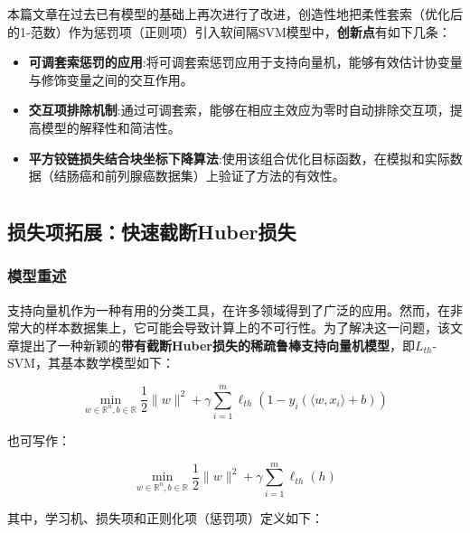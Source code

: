 \documentclass[12pt]{article}  %
\newcommand{\upcite}[1]{\textsuperscript{\textsuperscript{\cite{#1}}}}
\begin{document}
本篇文章在过去已有模型的基础上再次进行了改进，创造性地把柔性套索（优化后的1-范数）作为惩罚项（正则项）引入软间隔SVM模型中，\textbf{创新点}有如下几条：

\begin{itemize}
	\setlength{\parsep}{0ex} %
	\setlength{\topsep}{2ex} %
	\setlength{\itemsep}{1ex} %
	\item \textbf{可调套索惩罚的应用}:将可调套索惩罚应用于支持向量机，能够有效估计协变量与修饰变量之间的交互作用。
	\item \textbf{交互项排除机制}:通过可调套索，能够在相应主效应为零时自动排除交互项，提高模型的解释性和简洁性。
	\item \textbf{平方铰链损失结合块坐标下降算法}:使用该组合优化目标函数，在模拟和实际数据（结肠癌和前列腺癌数据集）上验证了方法的有效性。
\end{itemize}

\subsection{损失项拓展：快速截断Huber损失\upcite{3}}
\subsubsection{模型重述}

支持向量机作为一种有用的分类工具，在许多领域得到了广泛的应用。然而，在非常大的样本数据集上，它可能会导致计算上的不可行性。为了解决这一问题，该文章提出了一种新颖的\textbf{带有截断Huber损失的稀疏鲁棒支持向量机模型}，即$L_{th}$-SVM，其基本数学模型如下：

\begin{equation}
	\min_{w \in \mathbb{R}^n, b \in \mathbb{R}} \frac{1}{2} \|w\|^2 + \gamma \sum_{i=1}^m \ell_{th}(1 - y_i(\langle w, x_i \rangle + b)) 
\end{equation}

也可写作：

\begin{equation}
	\min_{w \in \mathbb{R}^n, b \in \mathbb{R}} \frac{1}{2} \|w\|^2 + \gamma \sum_{i=1}^m \ell_{th}(h) 
\end{equation}

其中，学习机、损失项和正则化项（惩罚项）定义如下：
\end{document}
